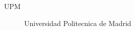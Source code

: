 \begin{acronyms}

\begin{description}

\item[UPM] Universidad Politecnica de Madrid

\end{description}

\end{acronyms}
